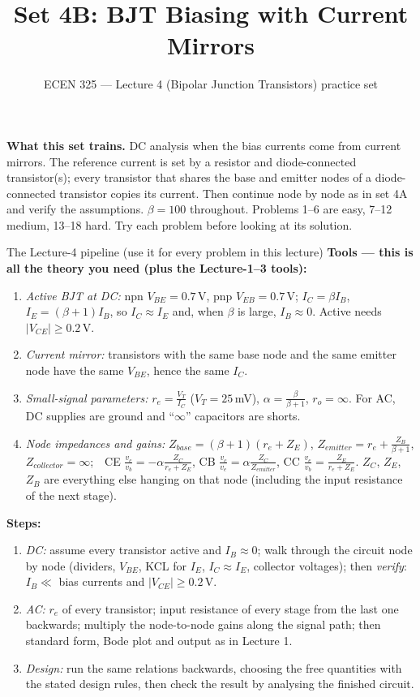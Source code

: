 \documentclass[11pt]{article}
\title{Set 4B: BJT Biasing with Current Mirrors}
\author{ECEN 325 --- Lecture 4 (Bipolar Junction Transistors) practice set}
\date{}
\begin{document}
\maketitle

\textbf{What this set trains.} DC analysis when the bias currents come from current mirrors. The reference current is
set by a resistor and diode-connected transistor(s); every transistor that shares the base and emitter nodes of a
diode-connected transistor copies its current. Then continue node by node as in set 4A and verify the assumptions.
$\beta = 100$ throughout. Problems 1--6 are easy, 7--12 medium, 13--18 hard. Try each problem before looking at its
solution.


\begin{cardbox}{The Lecture-4 pipeline (use it for every problem in this lecture)}
\textbf{Tools --- this is all the theory you need (plus the Lecture-1--3 tools):}
\begin{enumerate}[label=\textbf{T\arabic*},leftmargin=2.2em,itemsep=1pt]
\item \emph{Active BJT at DC:} npn $V_{BE}=0.7$\,V, pnp $V_{EB}=0.7$\,V; $I_C=\beta I_B$, $I_E=(\beta+1)I_B$, so
      $I_C\approx I_E$ and, when $\beta$ is large, $I_B\approx 0$. Active needs $|V_{CE}|\ge 0.2$\,V.
\item \emph{Current mirror:} transistors with the same base node and the same emitter node have the same $V_{BE}$,
      hence the same $I_C$.
\item \emph{Small-signal parameters:} $r_e = \frac{V_T}{I_C}$ ($V_T=25$\,mV), $\alpha=\frac{\beta}{\beta+1}$, $r_o=\infty$.
      For AC, DC supplies are ground and ``$\infty$'' capacitors are shorts.
\item \emph{Node impedances and gains:} $Z_{base}=(\beta+1)(r_e+Z_E)$, $Z_{emitter}=r_e+\frac{Z_B}{\beta+1}$,
      $Z_{collector}=\infty$;\ \ CE $\frac{v_c}{v_b}=-\alpha\frac{Z_C}{r_e+Z_E}$, CB $\frac{v_c}{v_e}=\alpha\frac{Z_C}{Z_{emitter}}$,
      CC $\frac{v_e}{v_b}=\frac{Z_E}{r_e+Z_E}$. $Z_C$, $Z_E$, $Z_B$ are everything else hanging on that node
      (including the input resistance of the next stage).
\end{enumerate}
\textbf{Steps:}
\begin{enumerate}[leftmargin=2.2em,itemsep=1pt]
\item \emph{DC:} assume every transistor active and $I_B\approx0$; walk through the circuit node by node
      (dividers, $V_{BE}$, KCL for $I_E$, $I_C\approx I_E$, collector voltages); then \emph{verify}: $I_B\ll$ bias currents and
      $|V_{CE}|\ge0.2$\,V.
\item \emph{AC:} $r_e$ of every transistor; input resistance of every stage from the last one backwards; multiply the
      node-to-node gains along the signal path; then standard form, Bode plot and output as in Lecture 1.
\item \emph{Design:} run the same relations backwards, choosing the free quantities with the stated design rules, then
      check the result by analysing the finished circuit.
\end{enumerate}
\end{cardbox}
\end{document}
